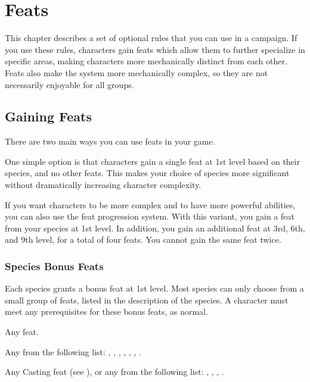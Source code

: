 \chapter{Feats}\label{Feats}

This chapter describes a set of optional rules that you can use in a campaign.
If you use these rules, characters gain feats which allow them to further specialize in specific areas, making characters more mechanically distinct from each other.
Feats also make the system more mechanically complex, so they are not necessarily enjoyable for all groups.

\section{Gaining Feats}
    There are two main ways you can use feats in your game.

    One simple option is that characters gain a single feat at 1st level based on their species, and no other feats.
    This makes your choice of species more significant without dramatically increasing character complexity.

    If you want characters to be more complex and to have more powerful abilities, you can also use the feat progression system.
    With this variant, you gain a feat from your species at 1st level.
    In addition, you gain an additional feat at 3rd, 6th, and 9th level, for a total of four feats.
    You cannot gain the same feat twice.

    \subsection{Species Bonus Feats}\label{Species Bonus Feats}
        Each species grants a bonus feat at 1st level. Most species can only choose from a small group of feats, listed in the description of the species. A character must meet any prerequisites for these bonus feats, as normal.

         Any feat.

         Any from the following list: , , , , , , .

         Any Casting feat (see ), or any from the following list: , , , .

